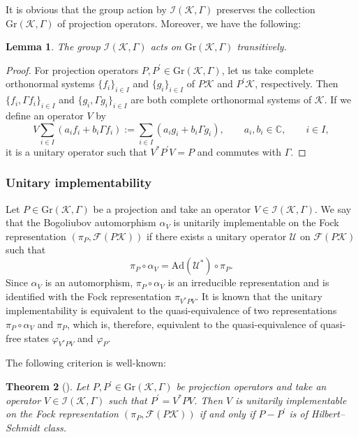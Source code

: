 \documentclass[pdftex]{sigma}
\numberwithin{equation}{section}
\newtheorem{Theorem}{Theorem}[section]
\newtheorem{Lemma}[Theorem]{Lemma}
\newcommand{\pr}[1]{#1^{\prime}}
\newcommand{\mcal}[1]{\mathcal{#1}}
\newcommand{\mbb}[1]{\mathbb{#1}}
\newcommand{\mrm}[1]{\mathrm{#1}}
\begin{document}
It is obvious that the group action by $\mcal{I}(\mcal{K},\Gamma)$ preserves the collection $\mrm{Gr}(\mcal{K},\Gamma)$ of projection operators. Moreover, we have the following:
\begin{Lemma}
The group $\mcal{I}(\mcal{K},\Gamma)$ acts on $\mrm{Gr}(\mcal{K},\Gamma)$ transitively.
\end{Lemma}
\begin{proof}
For projection operators $P, \pr{P}\in \mrm{Gr}(\mcal{K},\Gamma)$, let us take complete orthonormal systems $\{f_{i}\}_{i\in I}$ and $\{g_{i}\}_{i\in I}$ of $P\mcal{K}$ and $\pr{P}\mcal{K}$, respectively. Then $\{f_{i},\Gamma f_{i}\}_{i\in I}$ and $\{g_{i},\Gamma g_{i}\}_{i\in I}$ are both complete orthonormal systems of $\mcal{K}$. If we define an operator $V$ by
\begin{equation*}
	V\sum_{i\in I} (a_{i}f_{i}+b_{i}\Gamma f_{i} ):=\sum_{i\in I}(a_{i}g_{i}+b_{i}\Gamma g_{i}),\qquad a_{i}, b_{i}\in\mbb{C},\qquad i\in I,
\end{equation*}
it is a unitary operator such that $V^{\ast}\pr{P}V=P$ and commutes with $\Gamma$.
\end{proof}

\subsubsection{Unitary implementability}
Let $P\in \mrm{Gr}(\mcal{K},\Gamma)$ be a projection and take an operator $V\in \mcal{I}(\mcal{K},\Gamma)$.
We say that the Bogoliubov automorphism $\alpha_{V}$ is unitarily implementable on the Fock representation $(\pi_{P},\mcal{F}(P\mcal{K}))$ if there exists a unitary operator $\mcal{U}$ on $\mcal{F}(P\mcal{K})$ such that
\begin{equation*}
	\pi_{P}\circ \alpha_{V}=\mrm{Ad}(\mcal{U}^{\ast})\circ \pi_{P}.
\end{equation*}
Since $\alpha_{V}$ is an automorphism, $\pi_{P}\circ\alpha_{V}$ is an irreducible representation and is identified with the Fock representation $\pi_{V^{\ast}PV}$.
It is known that the unitary implementability is equivalent to the quasi-equivalence of two representations $\pi_{P}\circ \alpha_{V}$ and $\pi_{P}$, which is, therefore, equivalent to the quasi-equivalence of quasi-free states $\varphi_{V^{\ast}PV}$ and $\varphi_{P}$.

The following criterion is well-known:
\begin{Theorem}[\cite{Araki1970, PowersStormer1970, ShaleStinespring1965}]
\label{thm:implementability}
Let $P, \pr{P}\in \mrm{Gr}(\mcal{K},\Gamma)$ be projection operators and take an operator $V\in \mcal{I}(\mcal{K},\Gamma)$ such that $\pr{P}=V^{\ast}PV$.
Then $V$ is unitarily implementable on the Fock representation $(\pi_{P},\mcal{F}(P\mcal{K}))$ if and only if $P-\pr{P}$ is of Hilbert--Schmidt class.
\end{Theorem}
\end{document}
